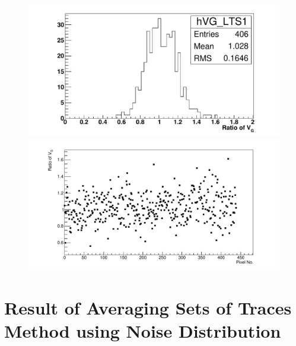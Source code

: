 \begin{figure} %
\includegraphics[width=\textwidth]{chapters/graphs/GainVarsMeas/LL_m04_2016-06-11/Set0and2/GainVairanceHist_Average_LTS.pdf}
\caption{}
\vspace{3mm}
\includegraphics[width=\textwidth]{chapters/graphs/GainVarsMeas/LL_m04_2016-06-11/Set0and2/GainVars_Vs_Pixel_GainVariance_AverageLTS_Set0and2.pdf}
\caption{}
\end{figure}

\section{Result of Averaging Sets of Traces Method using Noise Distribution}

